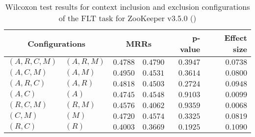 
\begin{table}
\begin{spacing}{1.2}
\centering
\caption{Wilcoxon test results for context inclusion and exclusion configurations of the FLT task for ZooKeeper v3.5.0 (\ctwo)}
\label{table:versus-wilcox-zookeeper-flt-context}
\begin{tabular}{ll|rr|rr}
\toprule
      \multicolumn{2}{c|}{Configurations} &                \multicolumn{2}{c|}{MRRs} &             p-value & Effect size \\
\midrule
 $(A,R,C,M)$ &  $(A,R,M)$ &       $0.4788$ &  $\bm{0.4790}$ & $0.3947$ &    $0.0738$ \\
   $(A,C,M)$ &    $(A,M)$ &  $\bm{0.4950}$ &       $0.4531$ & $0.3614$ &    $0.0800$ \\
   $(A,R,C)$ &    $(A,R)$ &  $\bm{0.4818}$ &       $0.4503$ & $0.2724$ &    $0.0948$ \\
     $(A,C)$ &      $(A)$ &  $\bm{0.4745}$ &       $0.4548$ & $0.9103$ &    $0.0099$ \\
   $(R,C,M)$ &    $(R,M)$ &  $\bm{0.4576}$ &       $0.4062$ & $0.9359$ &    $0.0068$ \\
     $(C,M)$ &      $(M)$ &  $\bm{0.4720}$ &       $0.4574$ & $0.3325$ &    $0.0819$ \\
     $(R,C)$ &      $(R)$ &  $\bm{0.4003}$ &       $0.3669$ & $0.1925$ &    $0.1090$ \\
\bottomrule
\end{tabular}

\end{spacing}
\end{table}

